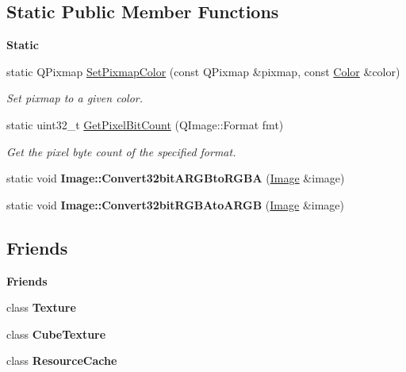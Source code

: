 \subsection*{Static Public Member Functions}
\begin{Indent}\textbf{ Static}\par
\begin{DoxyCompactItemize}
\item 
\mbox{\label{classrev_1_1_image_a02db303149ab1912909620178e86c128}} 
static Q\+Pixmap \mbox{\hyperlink{classrev_1_1_image_a02db303149ab1912909620178e86c128}{Set\+Pixmap\+Color}} (const Q\+Pixmap \&pixmap, const \mbox{\hyperlink{classrev_1_1_color}{Color}} \&color)
\begin{DoxyCompactList}\small\item\em Set pixmap to a given color. \end{DoxyCompactList}\item 
\mbox{\label{classrev_1_1_image_a2733b33e4e569a9fceefe7cb04e6f92d}} 
static uint32\+\_\+t \mbox{\hyperlink{classrev_1_1_image_a2733b33e4e569a9fceefe7cb04e6f92d}{Get\+Pixel\+Bit\+Count}} (Q\+Image\+::\+Format fmt)
\begin{DoxyCompactList}\small\item\em Get the pixel byte count of the specified format. \end{DoxyCompactList}\item 
\mbox{\label{classrev_1_1_image_ace7e0ff50197a787d94f2d743c42d80e}} 
static void {\bfseries Image\+::\+Convert32bit\+A\+R\+G\+Bto\+R\+G\+BA} (\mbox{\hyperlink{classrev_1_1_image}{Image}} \&image)
\item 
\mbox{\label{classrev_1_1_image_a5c6b35b6289431bb09c1594df962e3e3}} 
static void {\bfseries Image\+::\+Convert32bit\+R\+G\+B\+Ato\+A\+R\+GB} (\mbox{\hyperlink{classrev_1_1_image}{Image}} \&image)
\end{DoxyCompactItemize}
\end{Indent}
\subsection*{Friends}
\begin{Indent}\textbf{ Friends}\par
\begin{DoxyCompactItemize}
\item 
\mbox{\label{classrev_1_1_image_af7f909106d08e36cd50aa58e36f9bf47}} 
class {\bfseries Texture}
\item 
\mbox{\label{classrev_1_1_image_a79d71cc40420e3caed0020dbbeda75e0}} 
class {\bfseries Cube\+Texture}
\item 
\mbox{\label{classrev_1_1_image_a56e8a483ca41b93ad56ef41fd78c6398}} 
class {\bfseries Resource\+Cache}
\end{DoxyCompactItemize}
\end{Indent}
